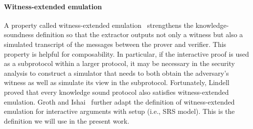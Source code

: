 

\paragraph{Witness-extended emulation} A property called witness-extended emulation~\cite{C:Lindell01} strengthens the knowledge-soundness definition so that the extractor outputs not only a witness but also a simulated transcript of the messages between the prover and verifier. This property is helpful for composability. In particular, if the interactive proof is used as a subprotocol within a larger protocol, it may be necessary in the security analysis to construct a simulator that needs to both obtain the adversary's witness as well as simulate its view in the subprotocol. Fortunately, Lindell~\cite{C:Lindell01} proved that every knowledge sound protocol also satisfies witness-extended emulation. Groth and Ishai~\cite{EC:GroIsh08} further adapt the definition of witness-extended emulation for interactive arguments with setup (i.e., SRS model). This is the definition we will use in the present work. 

